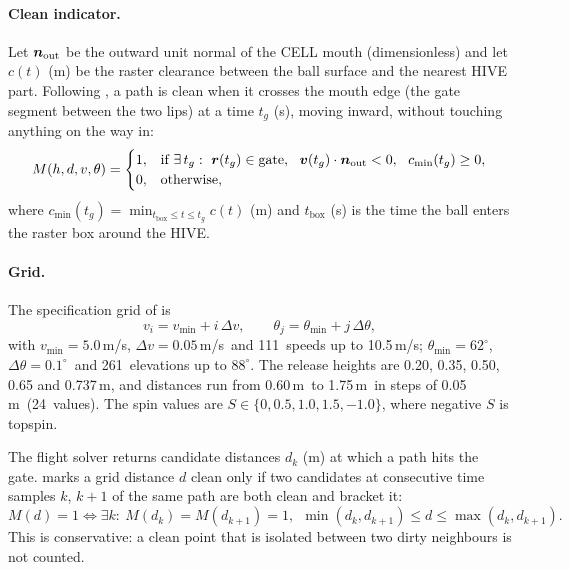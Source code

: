 \paragraph{Clean indicator.}
Let $\bm{n}_{\mathrm{out}}$ be the outward unit normal of the CELL mouth (dimensionless) and let
$c(t)$ (\unit{m}) be the raster clearance between the ball surface and the nearest HIVE part.
Following , a path is clean when it crosses the mouth edge (the gate segment
between the two lips) at a time $t_g$ (\unit{s}), moving inward, without touching anything on the
way in:
\begin{equation}
  M(h,d,v,\theta) =
  \begin{cases}
    1, & \text{if } \exists\, t_g:\ \vect{r}(t_g)\in\text{gate},\ \
         \vect{v}(t_g)\cdot\vect{n}_{\mathrm{out}} < 0,\ \ c_{\min}(t_g) \ge 0, \\
    0, & \text{otherwise,}
  \end{cases}
  \label{eq:robust_spec-mask}
\end{equation}
where $c_{\min}(t_g)=\min_{t_{\mathrm{box}}\le t\le t_g} c(t)$ (\unit{m}) and $t_{\mathrm{box}}$ (\unit{s})
is the time the ball enters the raster box around the HIVE.

\paragraph{Grid.}
The specification grid of  is
\begin{equation}
  v_i = v_{\min} + i\,\Delta v,\qquad \theta_j = \theta_{\min} + j\,\Delta\theta ,
  \label{eq:robust_spec-grid}
\end{equation}
with $v_{\min}=5.0$\,\unit{m/s}\assumed, $\Delta v = 0.05$\,\unit{m/s}\assumed\ and 111\derived\ speeds up
to 10.5\,\unit{m/s}\assumed; $\theta_{\min}=62^\circ$\assumed, $\Delta\theta=0.1^\circ$\assumed\ and
261\derived\ elevations up to $88^\circ$\assumed.
The release heights are 0.20, 0.35, 0.50, 0.65 and 0.737\,\unit{m}\assumed, and distances run from
0.60\,\unit{m}\assumed\ to 1.75\,\unit{m}\assumed\ in steps of 0.05\,\unit{m}\assumed\ (24\derived\ values).
The spin values are $S\in\{0, 0.5, 1.0, 1.5, -1.0\}$\assumed, where negative $S$ is topspin.

The flight solver returns candidate distances $d_k$ (\unit{m}) at which a path hits the gate.
\code{grid\_from\_candidates} marks a grid distance $d$ clean only if two candidates at consecutive
time samples $k$, $k+1$ of the same path are both clean and bracket it:
\begin{equation}
  M(d) = 1 \iff \exists k:\ M(d_k)=M(d_{k+1})=1,\ \ \min(d_k,d_{k+1}) \le d \le \max(d_k,d_{k+1}).
  \label{eq:robust_spec-dcell}
\end{equation}
This is conservative: a clean point that is isolated between two dirty neighbours is not counted.

